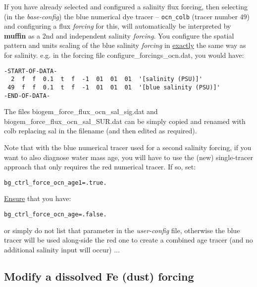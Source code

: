 If you have already selected and configured a salinity flux forcing, then selecting (in the \textit{base-config}) the blue numerical dye tracer -- \texttt{ocn\_colb} (tracer number \(49\)) and configuring a flux \textit{forcing} for this, will automatically be interpreted by \textbf{muffin} as a 2nd and independent salinity \textit{forcing}. You configure the spatial pattern and units scaling of the blue salinity \textit{forcing} in \uline{exactly} the same way as for salinity. e.g. in the forcing file \textsf{\footnotesize configure\_forcings\_ocn.dat}, you would have:

\vspace{-2mm}\small\begin{verbatim}
-START-OF-DATA-
  2  f  f  0.1  t  f  -1  01  01  01  '[salinity (PSU)]'
 49  f  f  0.1  t  f  -1  01  01  01  '[blue salinity (PSU)]'
-END-OF-DATA-
\end{verbatim}\normalsize\vspace{-2mm}

The files \textsf{\footnotesize biogem\_force\_flux\_ocn\_sal\_sig.dat} and \textsf{\footnotesize biogem\_force\_flux\_ocn\_sal\_SUR.dat} can be simply copied and renamed with \textsf{\footnotesize colb} replacing \textsf{\footnotesize sal} in the filename (and then edited as required).

Note that with the blue numerical tracer used for a second salinity forcing, if you want to also diagnose water mass age, you will have to use the (new) single-tracer approach that only requires the red numerical tracer. If so, set:
\vspace{-2pt}\small\begin{verbatim}
bg_ctrl_force_ocn_age1=.true.
\end{verbatim}\normalsize\vspace{-2pt}
\uline{Ensure} that you have:
\vspace{-2pt}\small\begin{verbatim}
bg_ctrl_force_ocn_age=.false.
\end{verbatim}\normalsize\vspace{-2pt}
or simply do not list that parameter in the \textit{user-config} file, otherwise the blue tracer will be used along-side the red one to create a combined age tracer (and no additional salinity input will occur) ...

%
\newpage
\subsection*{Modify a dissolved Fe (dust) forcing}
\vspace{1mm}

